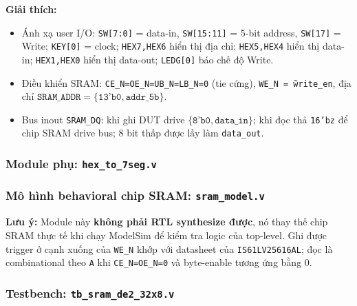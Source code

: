 \documentclass[12pt,a4paper]{article}
\begin{document}
\textbf{Giải thích:}
\begin{itemize}[leftmargin=1.5cm]
    \item Ánh xạ user I/O: \texttt{SW[7:0]} = data-in, \texttt{SW[15:11]} = 5-bit address, \texttt{SW[17]} = Write; \texttt{KEY[0]} = clock; \texttt{HEX7,HEX6} hiển thị địa chỉ; \texttt{HEX5,HEX4} hiển thị data-in; \texttt{HEX1,HEX0} hiển thị data-out; \texttt{LEDG[0]} báo chế độ Write.
    \item Điều khiển SRAM: \texttt{CE\_N=OE\_N=UB\_N=LB\_N=0} (tie cứng), \texttt{WE\_N = \~write\_en}, địa chỉ $\texttt{SRAM\_ADDR}=\{\texttt{13'b0}, \texttt{addr\_5b}\}$.
    \item Bus inout \texttt{SRAM\_DQ}: khi ghi DUT drive $\{\texttt{8'b0}, \texttt{data\_in}\}$; khi đọc thả \texttt{16'bz} để chip SRAM drive bus; 8 bit thấp được lấy làm \texttt{data\_out}.
\end{itemize}

\subsubsection{Module phụ: \texttt{hex\_to\_7seg.v}}


\subsubsection{Mô hình behavioral chip SRAM: \texttt{sram\_model.v}}


\textbf{Lưu ý:} Module này \textbf{không phải RTL synthesize được}, nó thay thế chip SRAM thực tế khi chạy ModelSim để kiểm tra logic của top-level. Ghi được trigger ở cạnh xuống của \texttt{WE\_N} khớp với datasheet của \texttt{IS61LV25616AL}; đọc là combinational theo \texttt{A} khi \texttt{CE\_N=OE\_N=0} và byte-enable tương ứng bằng 0.

\subsubsection{Testbench: \texttt{tb\_sram\_de2\_32x8.v}}

\end{document}
